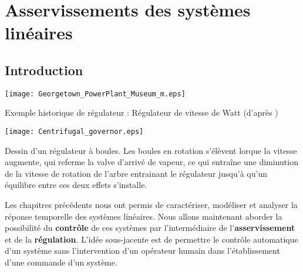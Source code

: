 \chapter[Asservissements Linéaires]{Asservissements des systèmes 
linéaires\label{chap-asservis}}
\minitoc
\newpage
{}
\captionsetup{width=0.9\linewidth}
\section{Introduction}
\begin{marginfigure}
    \centering
    \texttt{[image: Georgetown\_PowerPlant\_Museum\_m.eps]}
    \caption{Exemple historique de régulateur : Régulateur 
             de vitesse de Watt (d'après \cite{watt})\label{fig-hist}}
\end{marginfigure}
\begin{marginfigure}
    \centering
    \texttt{[image: Centrifugal\_governor.eps]} 
    \caption*{Dessin d'un régulateur à boules. Les boules en rotation s'élèvent 
    lorque la vitesse augmente, qui referme la valve d'arrivé de vapeur, ce qui 
    entraîne une diminution de la vitesse de rotation de l'arbre entrainant 
    le régulateur jusqu'à qu'un équilibre entre ces deux effets s'installe.}
\end{marginfigure}
Les chapitres précédents nous ont permis de caractériser, modéliser et
analyser la réponse temporelle des systèmes linéaires.
Nous allons maintenant aborder la possibilité du \textbf{contrôle} de ces 
systèmes par l'intermédiaire de l'\textbf{asservissement} et de 
la \textbf{régulation}. 
L'idée sous-jacente est de permettre le contrôle automatique d'un système
sans l'intervention d'un opérateur humain dans l'établissement d'une commande
d'un système. 

